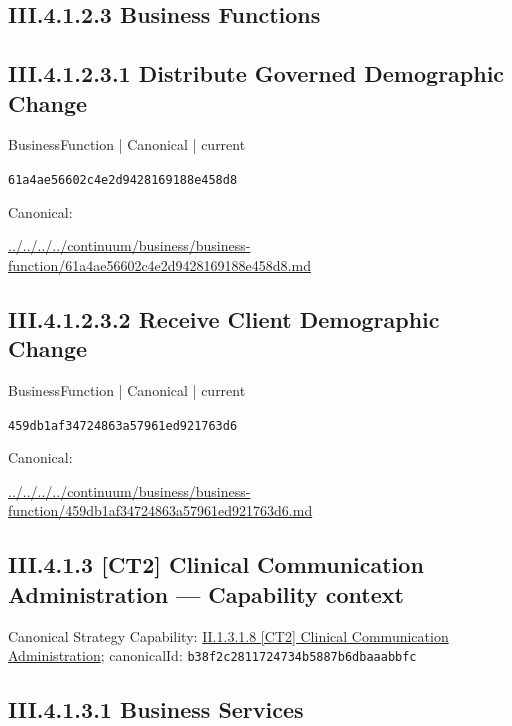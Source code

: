 \documentclass[10pt,a4paper]{article}
\begin{document}
\subsection*{III.4.1.2.3 Business Functions}
\subsection*{III.4.1.2.3.1 Distribute Governed Demographic Change}
\label{element-61a4ae56602c4e2d9428169188e458d8}
{\small BusinessFunction | Canonical | current}\par
\texttt{61a4ae56602c4e2d9428169188e458d8}\par
Canonical: \par
{\footnotesize\url{../../../../continuum/business/business-function/61a4ae56602c4e2d9428169188e458d8.md}}\par
\subsection*{III.4.1.2.3.2 Receive Client Demographic Change}
\label{element-459db1af34724863a57961ed921763d6}
{\small BusinessFunction | Canonical | current}\par
\texttt{459db1af34724863a57961ed921763d6}\par
Canonical: \par
{\footnotesize\url{../../../../continuum/business/business-function/459db1af34724863a57961ed921763d6.md}}\par
\subsection*{III.4.1.3 [CT2] Clinical Communication Administration — Capability context}
Canonical Strategy Capability: \hyperref[element-b38f2c2811724734b5887b6dbaaabbfc]{II.1.3.1.8 [CT2] Clinical Communication Administration}; canonicalId: \texttt{b38f2c2811724734b5887b6dbaaabbfc}\par
\subsection*{III.4.1.3.1 Business Services}
\end{document}
